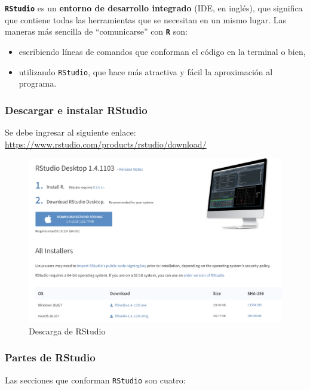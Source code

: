 \documentclass[
]{article}
\begin{document}
\textbf{\texttt{RStudio}} es un \textbf{entorno de desarrollo integrado} (IDE, en inglés), que significa que contiene todas las herramientas que se necesitan en un mismo lugar. Las maneras más sencilla de ``comunicarse'' con \textbf{\texttt{R}} son:

\begin{itemize}
\item
  escribiendo líneas de comandos que conforman el código en la terminal o bien,
\item
  utilizando \texttt{RStudio}, que hace más atractiva y fácil la aproximación al programa.
\end{itemize}

\hypertarget{descargar-e-instalar-rstudio}{%
\subsubsection{Descargar e instalar RStudio}\label{descargar-e-instalar-rstudio}}

Se debe ingresar al siguiente enlace: \url{https://www.rstudio.com/products/rstudio/download/}

\begin{figure}

{\centering \includegraphics[width=0.8\linewidth]{imagenes/RStudio_desc} 

}

\caption{Descarga de RStudio}\label{fig:unnamed-chunk-138}
\end{figure}

\hypertarget{partes-de-rstudio}{%
\subsubsection{Partes de RStudio}\label{partes-de-rstudio}}

Las secciones que conforman \texttt{RStudio} son cuatro:
\end{document}
